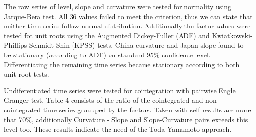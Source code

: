 \documentclass{article}
\begin{document}
The raw series of level, slope and curvature were tested for normality using Jarque-Bera test. All 36 values failed to meet the criterion, thus we can state that neither time series follow normal distribution. 
Additionally the factor values were tested fot unit roots using the Augmented Dickey-Fuller (ADF) and Kwiatkowski-Phillips-Schmidt-Shin (KPSS) tests. China curvature and Japan slope found to be stationary (according to ADF) on standard 95\% confidence level. Differentiating the remaining time series became stationary according to both unit root tests.

Undiferentiated time series were tested for cointegration with pairwise Engle Granger test. Table 4 consists of the ratio of the cointegrated and non-cointegrated time series grouuped by the factors. Taken with self results are more that 70\%, additionally Curvature - Slope and Slope-Curvature pairs exceeds this level too. These results indicate the need of the Toda-Yamamoto approach.
\end{document}
